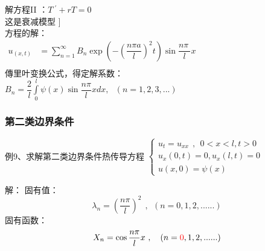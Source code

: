 \begin{frame}
      \frametitle{}
      解方程II ：$\displaystyle  T~^{'} + rT=0 $ \\ \vspace{0.6em}
      这是衰减模型 {\color{red}{[例1]}}] \\ 
      方程的解：\\ \vspace{0.3cm}
      $\begin{array}{llll}
          u_(x,t) &= \sum\limits_{n=1}^{\infty } B_n  \exp(-(\dfrac{n\pi a}{l})^2 t) \sin \dfrac{n\pi~}{l} x \\
      \end{array}$ \\ 
      傳里叶变换公式，得定解系数：\\  
	$ \displaystyle B_n=  \dfrac{2}{l}\int\limits_{0 }^{l}  \psi (x) \sin \dfrac{ n\pi }{l} x dx , ~~~ (n=1,2,3,...) $\\ 
\end{frame}

\begin{frame}
      \frametitle{第二类边界条件}
        \begin{exampleblock} {例9、求解第二类边界条件热传导方程}
        $\displaystyle  \begin{cases}
            u_{t} =u_{xx} ~~,~~ 0<x<l, t>0\\
            u_x (0,t) =0, u_x (l,t)=0 \\
            u(x,0) =\psi(x)
        \end{cases}$ \\	
        \end{exampleblock}
        \alert{解：} 	
        固有值：
        \begin{equation*}
            \lambda_n =(\frac{n\pi}{l})^2 ~~,~~ (n=0,1,2,......)
        \end{equation*}
        固有函数：
        \begin{equation*}
            X_n=\cos \frac{n\pi}{l} x~,~~~  (n=\textcolor{red}{0},1,2,......)
        \end{equation*}
\end{frame}

